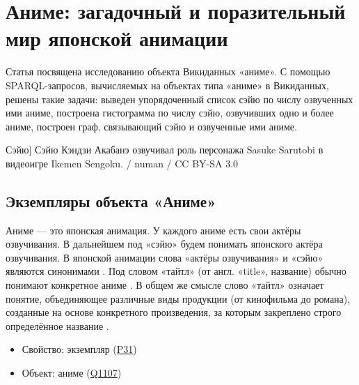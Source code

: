 
\chapter{Аниме: загадочный и поразительный мир японской анимации}
Статья посвящена исследованию объекта Викиданных «аниме». С помощью SPARQL-запросов, вычисляемых на объектах типа «аниме»
в Викиданных, решены такие задачи: выведен упорядоченный список сэйю по числу озвученных ими аниме, построена гистограмма по числу сэйю, озвучивших одно и более аниме, построен граф, связывающий сэйю и озвученные ими аниме. 


\begin{marginfigure}[0.0cm]
{
	\setlength{\fboxsep}{0pt}%
	\setlength{\fboxrule}{1pt}%
}
\caption
[Сэйю]
{
Сэйю Кэндзи Акабанэ озвучивал роль персонажа Sasuke Sarutobi в видеоигре Ikemen Sengoku. / numan / CC BY-SA 3.0
}
\label{fig:seyu}
\end{marginfigure}

\label{ch:anime}

\section{Экземпляры объекта «Аниме»}

Аниме — это японская анимация. У каждого аниме есть свои актёры озвучивания. В дальнейшем под «сэйю» будем понимать японского актёра озвучивания. В японской анимации слова «актёры озвучивания» и «сэйю» являются синонимами \cite{seiyu_def}. Под словом «тайтл» (от англ. «title», название) обычно понимают конкретное аниме \cite{anime_social}. В общем же смысле слово «тайтл» означает понятие, объединяющее различные виды продукции (от кинофильма до романа), созданные на основе конкретного произведения, за которым закреплено строго определённое название \cite{anime_title_def}.

\begin{itemize}
	\item Свойство: экземпляр (\href{https://www.wikidata.org/wiki/Property:P31}{P31})
	\item Объект: аниме (\href{https://www.wikidata.org/wiki/Q1107}{Q1107})
\end{itemize}


